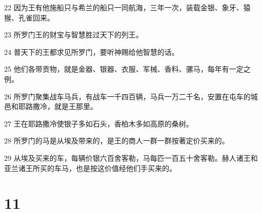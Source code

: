 \par 22 因为王有他施船只与希兰的船只一同航海，三年一次，装载金银、象牙、猿猴、孔雀回来。
\par 23 所罗门王的财宝与智慧胜过天下的列王。
\par 24 普天下的王都求见所罗门，要听神赐给他智慧的话。
\par 25 他们各带贡物，就是金器、银器、衣服、军械、香料、骡马，每年有一定之例。
\par 26 所罗门聚集战车马兵，有战车一千四百辆，马兵一万二千名，安置在屯车的城邑和耶路撒冷，就是王那里。
\par 27 王在耶路撒冷使银子多如石头，香柏木多如高原的桑树。
\par 28 所罗门的马是从埃及带来的，是王的商人一群一群按著定价买来的。
\par 29 从埃及买来的车，每辆价银六百舍客勒，马每匹一百五十舍客勒。赫人诸王和亚兰诸王所买的车马，也是按这价值经他们手买来的。

\chapter{11}

